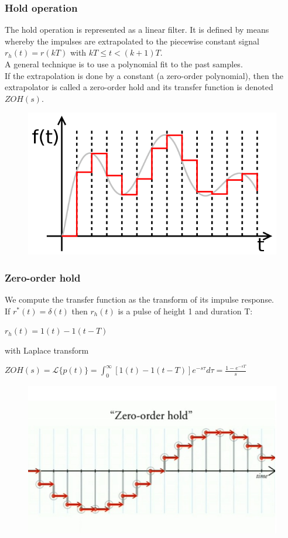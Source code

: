 \begin{frame}
	\frametitle{Hold operation}
	The hold operation is represented as a linear filter. It is defined by means whereby the impulses are extrapolated to the piecewise constant signal $r_h(t) = r(kT)$ with $kT \leq t < (k+1)T$.\\
	\medskip
	A general technique is to use a polynomial fit to the past samples.\\
	If the extrapolation is done by a constant (a zero-order polynomial), then the extrapolator is called a zero-order hold and its transfer function is denoted $ZOH(s)$. 
	\begin{figure}
		\includegraphics[width=0.52\linewidth]{sample_and_hold}
	\end{figure}
\end{frame}

\begin{frame}
	\frametitle{Zero-order hold}
	We compute the transfer function as the transform of its impulse response. \\
	\medskip
	If $r^*(t)=\delta(t)$ then $r_h(t)$ is a pulse of height 1 and duration T:\\
	\begin{center}
		$r_h(t) = 1(t) - 1(t-T)$\\
	\end{center}
	with Laplace transform\\
	\begin{center}
		$ZOH(s)=\mathcal{L}\{p(t)\} = \int_{0}^{\infty} [1(t)-1(t-T)]e^{-s\tau}d\tau = \frac{1-e^{-sT}}{s}$
	\end{center}
	\begin{figure}
		\includegraphics[width=0.48\linewidth]{zoh}
	\end{figure}
\end{frame}


